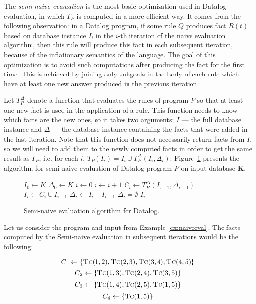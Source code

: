 The \emph{semi-naive evaluation} is the most basic optimization used in Datalog evaluation, in which $T_P$ is computed in a more efficient way. It comes from the following observation: in a Datalog program, if some rule $Q$ produces fact $R(t)$ based on database instance $I_i$ in the $i$-th iteration of the naive evaluation algorithm, then this rule will produce this fact in each subsequent iteration, because of the inflationary semantics of the language. The goal of this optimization is to avoid such computations after producing the fact for the first time. This is achieved by joining only subgoals in the body of each rule which have at least one new answer produced in the previous iteration. 

Let $T^\Delta_P$ denote a function that evaluates the rules of program $P$ so that at least one new fact is used in the application of a rule. This function needs to know which facts are the new ones, so it takes two arguments: $I$ --- the full database instance and $\Delta$ --- the database instance containing the facts that were added in the last iteration. Note that this function does not necessarily return facts from $I$, so we will need to add them to the newly computed facts in order to get the same result as $T_P$, i.e. for each $i$, $T_P(I_i) = I_i \cup T_P^\Delta(I_i, \Delta_i)$. Figure~\ref{psc:seminaiveevaldatalog} presents the algorithm for semi-naive evaluation of Datalog program $P$ on input database \textbf{K}.

\begin{figure}[!htbp]
\begin{codebox}
  \li $I_0 \leftarrow K$
  \li $\Delta_0 \leftarrow K$
  \li $i \leftarrow 0$
  \li \Repeat
	\li $i \leftarrow i + 1$
	\li $C_i \leftarrow T_P^\Delta(I_{i-1}, \Delta_{i-1})$
	\li $I_i \leftarrow C_i \cup I_{i-1}$
	\li $\Delta_i \leftarrow I_i - I_{i-1}$
  \li \Until $\Delta_i = \emptyset$
  \li \Return $I_i$
\end{codebox}
\caption{Semi-naive evaluation algorithm for Datalog.}\label{psc:seminaiveevaldatalog}
\end{figure}

\begin{exmp}
Let us consider the program and input from Example \ref{ex:naiveeval}. The facts computed by the Semi-naive evaluation in subsequent iterations would be the following:

$$C_1 \leftarrow \{\textsc{Tc}(1, 2), \textsc{Tc}(2, 3), \textsc{Tc}(3, 4), \textsc{Tc}(4, 5)\}$$
$$C_2 \leftarrow \{\textsc{Tc}(1, 3), \textsc{Tc}(2, 4), \textsc{Tc}(3, 5)\}$$
$$C_3 \leftarrow \{\textsc{Tc}(1, 4), \textsc{Tc}(2, 5), \textsc{Tc}(1, 5)\}$$
$$C_4 \leftarrow \{\textsc{Tc}(1, 5)\}$$
\label{ex:semieval}
\end{exmp}

